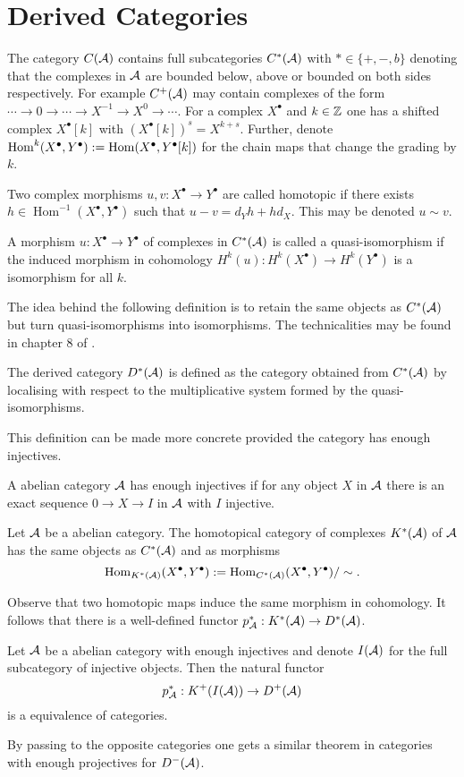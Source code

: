 \section{Derived Categories}
The category $C(\AA)$ contains full subcategories $C^*(\AA)$ with $*\in \{ +, -, b\}$ denoting that the complexes in $\AA$ are bounded below, above or bounded on both sides respectively.
For example $C^+(\AA)$ may contain complexes of the form $\cdots \to 0\to \cdots \to X^{-1} \to X^0 \to \cdots$.
For a complex $X^\bullet$ and $k\in \Z$ one has a shifted complex $X^\bullet[k]$ with $(X^\bullet[k])^s = X^{k+s}$.
Further, denote $\operatorname{Hom}^k(X^\bullet, Y^\bullet) :=  \op{Hom}(X^\bullet, Y^\bullet[k])$ for the chain maps that change the grading by $k$.
\begin{definition}
 Two complex morphisms $u,v:X^\bullet\to Y^\bullet$ are called homotopic if there exists $h\in \operatorname{Hom}^{-1}(X^\bullet, Y^\bullet)$ such that $u-v = d_Y h + hd_X$. This may be denoted $u\sim v$.
\end{definition}
\begin{definition}
 A morphism $u:X^\bullet\to Y^\bullet$  of complexes in $C^*(\AA)$ is called a quasi-isomorphism if the induced morphism in cohomology $H^k(u):H^k(X^\bullet) \to H^k(Y^\bullet)$ is a isomorphism for all $k$.
\end{definition}
The idea behind the following definition is to retain the same objects as $C^*(\AA)$ but turn quasi-isomorphisms into isomorphisms.
The technicalities may be found in chapter 8 of \cite{deligne1977sga}.
\begin{definition}
  The derived category $D^*(\AA)$ is defined as the category obtained from $C^*(\AA)$ by localising with respect to the multiplicative system formed by the quasi-isomorphisms.
\end{definition}
This definition can be made more concrete provided the category has enough injectives.
\begin{definition}
 A abelian category $\AA$ has enough injectives if for any object $X$ in $\AA$ there is an exact sequence $0\to X \to I$ in $\AA$ with $I$ injective.
\end{definition}
\begin{definition}
 Let $\AA$ be a abelian category.
 The homotopical category of complexes $K^*(\AA)$ of $\AA$ has the same objects as $C^*(\AA)$ and as morphisms
 $$\operatorname{Hom}_{K^*(\AA)}(X^\bullet,Y^\bullet):= \operatorname{Hom}_{C^*(\AA)}(X^\bullet,Y^\bullet)/\sim.$$
\end{definition}
Observe that two homotopic maps induce the same morphism in cohomology.
It follows that there is a well-defined functor $p_\AA^*:K^*(\AA)\to D^*(\AA)$.
\begin{proposition}{\cite[Chapter 1]{dimca2004sheaves}}\label{prop: DerivedCategoryInjectives}
 Let $\AA$ be a abelian category with enough injectives and denote $I(\AA)$ for the full subcategory of injective objects.
 Then the natural functor
 $$p_\AA^*: K^+(I(\AA))\to D^+(\AA) $$
 is a equivalence of categories.
\end{proposition}
By passing to the opposite categories one gets a similar theorem in categories with enough projectives for $D^-(\AA)$.
